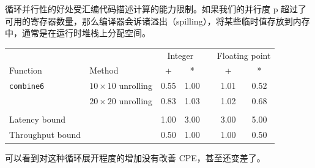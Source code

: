 循环并行性的好处受汇编代码描述计算的能力限制。如果我们的并行度 p 超过了可用的寄存器数量，那么编译器会诉诸溢出（spilling），将某些临时值存放到内存中，通常是在运行时堆栈上分配空间。

\begin{table}[!ht]
    \centering
    \begin{tabular}{llccccc}
        \toprule
        & & \multicolumn{2}{c}{Integer} & & \multicolumn{2}{c}{Floating point} \\
        \cmidrule{3-4} \cmidrule{6-7}
        Function & Method & + & * & & + & * \\
        \midrule
        \texttt{combine6} & $10 \times 10$ unrolling & 0.55 & 1.00 & & 1.01 & 0.52 \\
                          & $20 \times 20$ unrolling & 0.83 & 1.03 & & 1.02 & 0.68 \\
        \\
        Latency bound & & 1.00 & 3.00 & & 3.00 & 5.00 \\
        Throughput bound & & 0.50 & 1.00 & & 1.00 & 0.50 \\
        \bottomrule
    \end{tabular}
\end{table}

可以看到对这种循环展开程度的增加没有改善 CPE，甚至还变差了。
